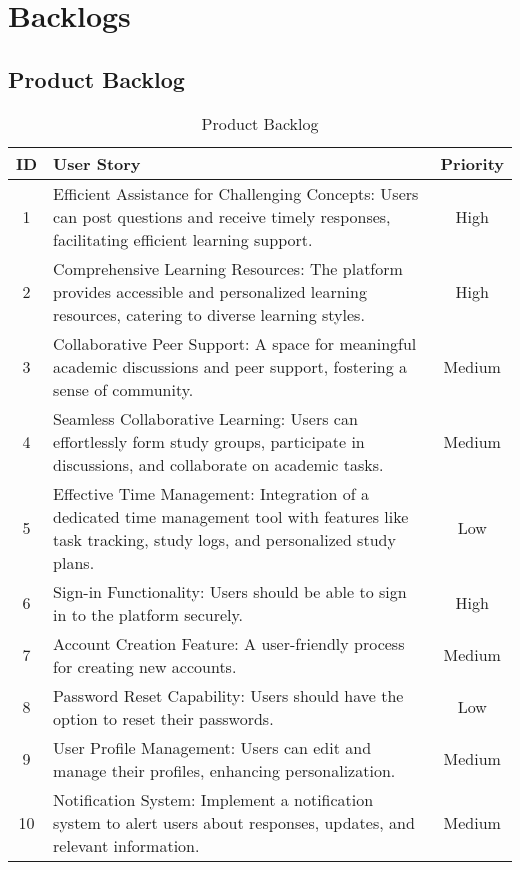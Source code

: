 \chapter{Backlogs}\label{backlog}

\section{Product Backlog}\label{product_backlog}

\begin{table}[h]
    \centering
    \caption*{Product Backlog}
    \begin{tabular}{|c|p{8cm}|c|}
        \hline
        \textbf{ID} & \textbf{User Story} & \textbf{Priority} \\
        \hline
        1 & Efficient Assistance for Challenging Concepts: Users can post questions and receive timely responses, facilitating efficient learning support. & High \\
        \hline
        2 & Comprehensive Learning Resources: The platform provides accessible and personalized learning resources, catering to diverse learning styles. & High \\
        \hline
        3 & Collaborative Peer Support: A space for meaningful academic discussions and peer support, fostering a sense of community. & Medium \\
        \hline
        4 & Seamless Collaborative Learning: Users can effortlessly form study groups, participate in discussions, and collaborate on academic tasks. & Medium \\
        \hline
        5 & Effective Time Management: Integration of a dedicated time management tool with features like task tracking, study logs, and personalized study plans. & Low \\
        \hline
        6 & Sign-in Functionality: Users should be able to sign in to the platform securely. & High \\
        \hline
        7 & Account Creation Feature: A user-friendly process for creating new accounts. & Medium \\
        \hline
        8 & Password Reset Capability: Users should have the option to reset their passwords. & Low \\
        \hline
        9 & User Profile Management: Users can edit and manage their profiles, enhancing personalization. & Medium \\
        \hline
        10 & Notification System: Implement a notification system to alert users about responses, updates, and relevant information. & Medium \\

\end{tabular}
\end{table}
